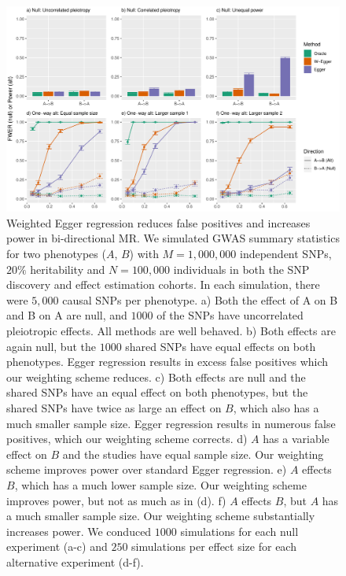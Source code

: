 \documentclass{article}
\begin{document}
\begin{figure}
\includegraphics[width=\textwidth]{figures/figure1.pdf}
\caption{Weighted Egger regression reduces false positives and increases power
 in bi-directional MR. We simulated GWAS summary statistics for two phenotypes
  ($A$, $B$) with $M=1,000,000$
independent SNPs, $20\%$ heritability and $N = 100,000$ individuals in both
 the SNP discovery and effect estimation cohorts. In each simulation, there
 were $5,000$ causal SNPs per phenotype. a) Both the effect of A on B and B on A are null,
 and $1000$ of the SNPs have uncorrelated pleiotropic effects. All methods are well behaved.
 b) Both effects are again null, but the $1000$ shared SNPs have equal effects on both
 phenotypes. Egger regression results in excess false positives which our weighting scheme
 reduces. c) Both effects are null and the shared SNPs have an equal effect on both phenotypes,
 but the shared SNPs have twice as large an effect on $B$, which also has a much smaller sample
 size. Egger regression results in numerous false positives, which our weighting scheme corrects.
 d) $A$ has a variable effect on $B$ and the studies have equal sample size. Our weighting
 scheme improves power over standard Egger regression. e) $A$ effects $B$, which has a much
 lower sample size. Our weighting scheme improves power, but not as much as in (d). f) $A$
  effects $B$, but $A$ has a much smaller sample size. Our weighting scheme substantially increases
  power. We conduced $1000$ simulations for each null experiment (a-c) and $250$ simulations
  per effect size for each alternative experiment (d-f).}
  \label{figure1}
\end{figure}
\end{document}
